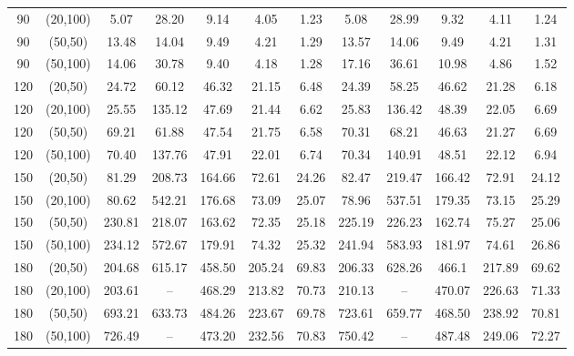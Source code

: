 \documentclass[12pt, eqno, limlimits]{article}
\begin{document}
\begin{sloppypar}
\begin{table}[htpb]
\begin{center}
\begin{tabular}{cccccccccccc}
                    90 & (20,100) & 5.07 & 28.20 & 9.14	& 4.05 & 1.23 &	5.08 & 28.99 & 9.32 & 4.11 & 1.24   \\ 
                    90 & (50,50)  & 13.48 &	14.04 &	9.49 & 4.21 & 1.29 & 13.57 & 14.06 & 9.49 &	4.21 & 1.31  \\ 
                    90 & (50,100) & 14.06 &	30.78 &	9.40 & 4.18	& 1.28 & 17.16 & 36.61 & 10.98 & 4.86 &	1.52  \\ 
                    120 & (20,50)  & 24.72 & 60.12 & 46.32 & 21.15 & 6.48 & 24.39 &	58.25 &	46.62 &	21.28 &	6.18  \\ 
                    120 & (20,100) & 25.55 & 135.12	& 47.69	& 21.44 & 6.62 & 25.83 & 136.42	& 48.39	& 22.05 & 6.69  \\ 
                    120 & (50,50)  & 69.21 & 61.88 & 47.54 & 21.75 & 6.58 &	70.31 &	68.21 &	46.63 &	21.27 &	6.69  \\ 
                    120 & (50,100) & 70.40 & 137.76	& 47.91 & 22.01	& 6.74 & 70.34 & 140.91	& 48.51	& 22.12	& 6.94  \\ 
                    150 & (20,50)  & 81.29 & 208.73	& 164.66 & 72.61 & 24.26 & 82.47 & 219.47 & 166.42 & 72.91 & 24.12 \\
                    150 & (20,100) & 80.62 & 542.21	& 176.68 & 73.09 & 25.07 & 78.96 & 537.51 &	179.35 & 73.15 & 25.29  \\ 
                    150 & (50,50)  & 230.81	& 218.07 & 163.62 &	72.35 &	25.18 &	225.19 & 226.23	& 162.74 & 75.27 & 25.06 \\			 
                    150 & (50,100) & 234.12 & 572.67 & 179.91 &	74.32 &	25.32 &	241.94 & 583.93	& 181.97 & 74.61 & 26.86 \\ 
                    180 & (20,50)  & 204.68	& 615.17 & 458.50 & 205.24 & 69.83 & 206.33 & 628.26 & 466.1 & 217.89 &	69.62  \\ 
                    180 & (20,100) & 203.61	& -- & 468.29 & 213.82 & 70.73 & 210.13	& -- & 470.07 &	226.63 & 71.33    \\ 
                    180 & (50,50)  & 693.21 & 633.73 & 484.26 &	223.67 & 69.78	& 723.61 & 659.77 &	468.50 & 238.92 & 70.81 \\ 
                    180 & (50,100) & 726.49	& -- & 473.20 & 232.56 & 70.83 & 750.42 & -- & 487.48	& 249.06 & 72.27    \\ 
                    \hline 	
                \end{tabular}
            \end{center} 
        \end{table}
        

\end{sloppypar}
\end{document}
